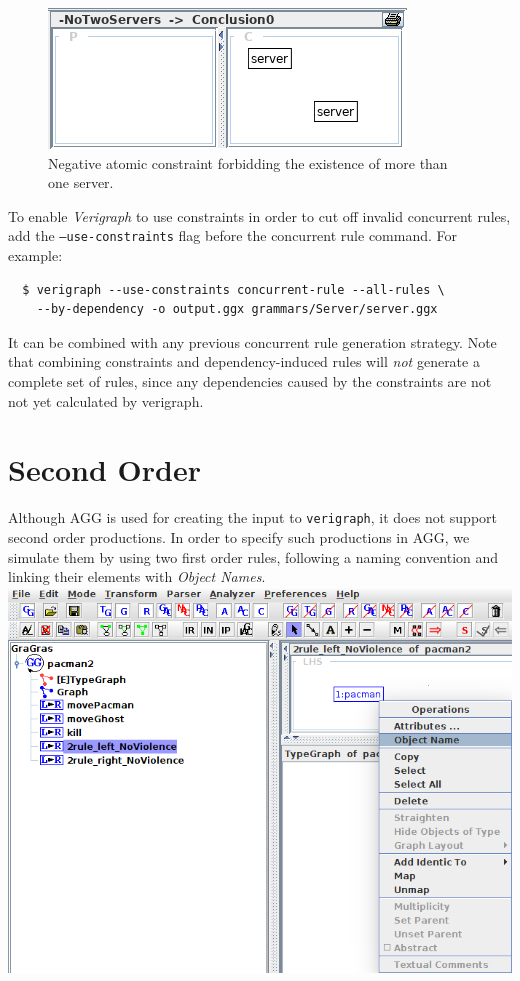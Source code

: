 \documentclass[12pt]{article}
\begin{document}
\begin{figure}
  \noindent
  \centering
  \includegraphics[scale = 0.6]{new_atomic02}
  \caption{Negative atomic constraint forbidding the existence of more than one server.}
\end{figure}


To enable \emph{Verigraph} to use constraints in order to cut off invalid concurrent rules, add the \texttt{--use-constraints} flag before the concurrent rule command. For example:

\begin{verbatim}
  $ verigraph --use-constraints concurrent-rule --all-rules \ 
    --by-dependency -o output.ggx grammars/Server/server.ggx
\end{verbatim}

It can be combined with any previous concurrent rule generation strategy.
Note that combining constraints and dependency-induced rules will \emph{not} generate a complete set of rules, since any dependencies caused by the constraints are not not yet calculated by verigraph.

\pagebreak

\section{Second Order}

Although AGG is used for creating the input to \texttt{verigraph}, it does not support second order productions. In order to specify such productions in AGG, we simulate them by using two first order rules, following a naming convention and linking their elements with \emph{Object Names}.\\

{\noindent\centering\includegraphics[scale = 0.5]{objName.png}\\}
\end{document}
